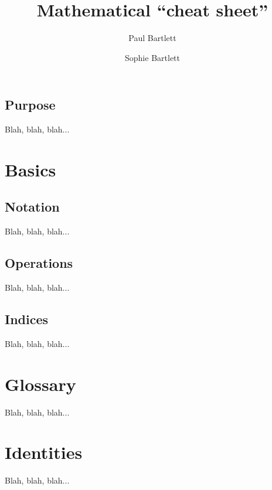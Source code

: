 \documentclass[11pt,two side,a4paper,openany]{book}
\title{Mathematical ``cheat sheet''}
\author{Paul Bartlett \and{Sophie Bartlett}}
\date{}
\begin{document}
\frontmatter
\maketitle
\tableofcontents
\section{Purpose}
Blah, blah, blah...

\mainmatter
\chapter{Basics}
\section{Notation}
Blah, blah, blah...
\section{Operations}
Blah, blah, blah...
\section{Indices}
Blah, blah, blah...

\appendix
\chapter{Glossary}
Blah, blah, blah...
\chapter{Identities}
Blah, blah, blah...
\end{document}
